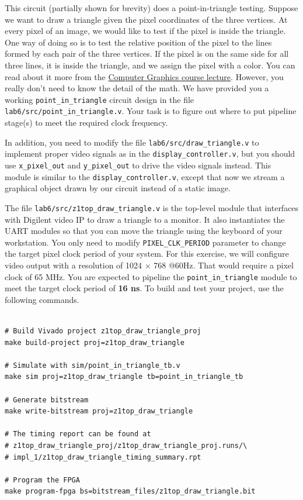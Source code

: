 \documentclass[11pt]{article}
\begin{document}
This circuit (partially shown for brevity) does a point-in-triangle testing. Suppose we want to draw a triangle given the pixel coordinates of the three vertices. At every pixel of an image, we would like to test if the pixel is inside the triangle. One way of doing so is to test the relative position of the pixel to the lines formed by each pair of the three vertices. If the pixel is on the same side for all three lines, it is inside the triangle, and we assign the pixel with a color. You can read about it more from the \href{https://cs184.eecs.berkeley.edu/sp19/lecture/2/rasterization}{Computer Graphics course lecture}. However, you really don't need to know the detail of the math. We have provided you a working \verb|point_in_triangle| circuit design in the file \verb|lab6/src/point_in_triangle.v|. Your task is to figure out where to put pipeline stage(s) to meet the required clock frequency.

In addition, you need to modify the file \verb|lab6/src/draw_triangle.v| to implement proper video signals as in the \verb|display_controller.v|, but you should use \verb|x_pixel_out| and \verb|y_pixel_out| to drive the video signals instead. This module is similar to the \verb|display_controller.v|, except that now we stream a graphical object drawn by our circuit instead of a static image.

The file \verb|lab6/src/z1top_draw_triangle.v| is the top-level module that interfaces with Digilent video IP to draw a triangle to a monitor. It also instantiates the UART modules so that you can move the triangle using the keyboard of your workstation.
You only need to modify \verb|PIXEL_CLK_PERIOD| parameter to change the target pixel clock period of your system. For this exercise, we will configure video output with a resolution of 1024 $\times$ 768 @60Hz. That would require a pixel clock of 65 MHz. You are expected to pipeline the \verb|point_in_triangle| module to meet the target clock period of \textbf{16 ns}. To build and test your project, use the following commands.

\begin{verbatim}

# Build Vivado project z1top_draw_triangle_proj
make build-project proj=z1top_draw_triangle

# Simulate with sim/point_in_triangle_tb.v
make sim proj=z1top_draw_triangle tb=point_in_triangle_tb

# Generate bitstream
make write-bitstream proj=z1top_draw_triangle

# The timing report can be found at
# z1top_draw_triangle_proj/z1top_draw_triangle_proj.runs/\
# impl_1/z1top_draw_triangle_timing_summary.rpt

# Program the FPGA
make program-fpga bs=bitstream_files/z1top_draw_triangle.bit
\end{verbatim}
\end{document}
